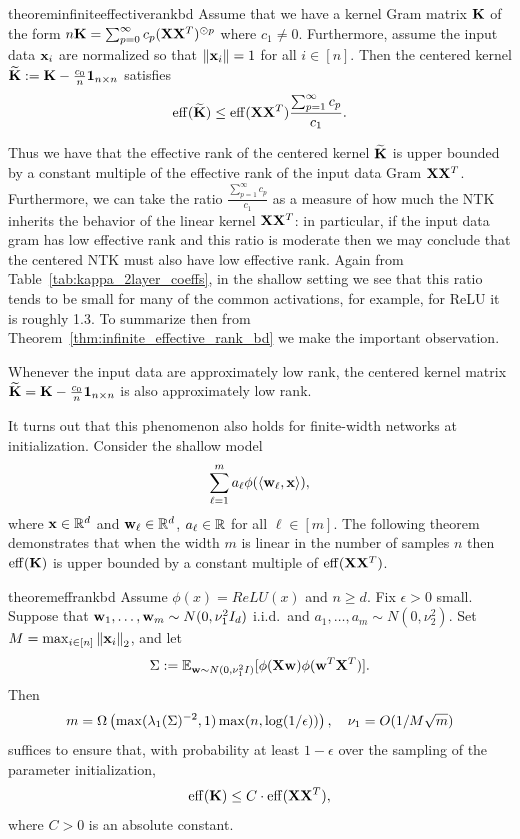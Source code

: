 \begin{restatable}{theorem}{infiniteeffectiverankbd}\label{thm:infinite_effective_rank_bd}
Assume that we have a kernel Gram matrix $\mathbf{K}$ of the form $n \mathbf{K} = \sum_{p = 0}^\infty c_p (\mathbf{X} \mathbf{X}^T)^{\odot p}$ where $c_1 \neq 0$.  Furthermore, assume the input data $\mathbf{x}_i$ are normalized so that $\left\lVert\mathbf{x}_i\right\rVert = 1$ for all $i \in [n]$.  Then the centered kernel $\widetilde{\mathbf{K}} := \mathbf{K} - \frac{c_0}{n} \mathbf{1}_{n \times n}$ satisfies 
\[ 
\mathrm{eff}(\widetilde{\mathbf{K}}) \leq \mathrm{eff}(\mathbf{X} \mathbf{X}^T) \frac{\sum_{p = 1}^\infty c_p}{c_1}. 
\]
\end{restatable}
Thus we have that the effective rank of the centered kernel $\widetilde{\mathbf{K}}$ is upper bounded by a constant multiple of the effective rank of the input data Gram $\mathbf{X}  \mathbf{X}^T$.  Furthermore, we can take the ratio $\frac{\sum_{p = 1}^\infty c_p}{c_1}$ as a measure of how much the NTK inherits the behavior of the linear kernel $\mathbf{X} \mathbf{X}^T$: in particular, if the input data gram has low effective rank and this ratio is moderate then we may conclude that the centered NTK must also have low effective rank.  Again from Table~\ref{tab:kappa_2layer_coeffs}, in the shallow setting we see that this ratio tends to be small for many of the common activations, for example, for ReLU it is roughly 1.3. To summarize then from Theorem~\ref{thm:infinite_effective_rank_bd} we make the important observation.
\begin{observation}\label{obs:centered_kernel_low_rank}
Whenever the input data are approximately low rank, the centered kernel matrix $\widetilde{\mathbf{K}} = \mathbf{K} - \frac{c_0}{n} \mathbf{1}_{n \times n}$ is also approximately low rank.
\end{observation}
\par
It turns out that this phenomenon also holds for finite-width networks at initialization. Consider the shallow model
\[
\sum_{\ell = 1}^m a_\ell \phi(\langle \mathbf w_\ell, \mathbf x \rangle) , 
\]
where $\mathbf{x} \in \mathbb{R}^d$ and $\mathbf{w}_\ell \in \mathbb{R}^d$, $a_\ell \in \mathbb{R}$ for all $\ell \in [m]$.  The following theorem demonstrates that when the width $m$ is linear in the number of samples $n$ then $\mathrm{eff}(\mathbf{K})$ is upper bounded by a constant multiple of $\mathrm{eff}(\mathbf{X} \mathbf{X}^T)$.
\begin{restatable}{theorem}{effrankbd}\label{thm:main_effective_rank_bd}
Assume $\phi(x) = ReLU(x)$ and $n \geq d$.  Fix $\epsilon > 0$ small.  Suppose that $\mathbf{w}_1, \ldots, \mathbf{w}_m \sim N(0, \nu_1^2 I_d)$ i.i.d.\ and $a_1, \ldots, a_m \sim N(0, \nu_2^2)$.  Set $M = \max_{i \in [n]} \left\lVert\mathbf{x}_i\right\rVert_2$, and let 
\[
\Sigma := \mathbb{E}_{\mathbf{w} \sim N(0, \nu_1^2 I)}[\phi(\mathbf{X} \mathbf{w}) \phi(\mathbf{w}^T \mathbf{X}^T)]. 
\]
Then
\[ 
m = \Omega\left(\max(\lambda_1(\Sigma)^{-2}, 1) \max(n, \log(1/\epsilon))\right), \quad \nu_1 = O(1/M\sqrt{m})  
\]
suffices to ensure that, with probability at least $1 - \epsilon$ over the sampling of the parameter initialization, 
\[ 
\mathrm{eff}(\mathbf{K}) \leq C \cdot \mathrm{eff}(\mathbf{X} \mathbf{X}^T),  
\]
where $C > 0$ is an absolute constant.
\end{restatable}
